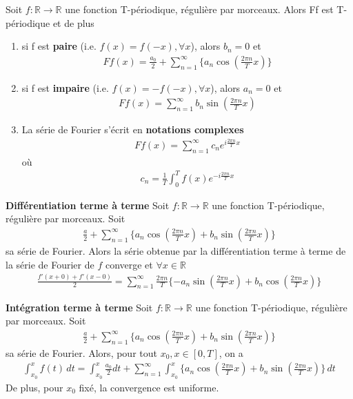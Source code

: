 Soit $f:\mathbb{R}\rightarrow\mathbb{R}$ une fonction T-périodique, régulière par morceaux. Alors Ff est T-périodique et de plus
\begin{enumerate}
	\item si f est \textbf{paire} (i.e. $f(x)=f(-x),\forall x$), alors $b_n=0$ et
	\begin{eqnarray}
		Ff(x)=\frac{a_0}{2}+\sum_{n=1}^{\infty}\{a_n\cos(\frac{2\pi n}{T}x)\}
	\end{eqnarray}
	
	\item si f est \textbf{impaire} (i.e. $f(x)=-f(-x),\forall x$), alors $a_n=0$ et
	\begin{eqnarray}
		Ff(x)=\sum_{n=1}^{\infty}b_n\sin(\frac{2\pi n}{T}x)
	\end{eqnarray}
	
	\item La série de Fourier s'écrit en \textbf{notations complexes}
	\begin{eqnarray}
		Ff(x)=\sum_{n=1}^{\infty}c_ne^{i\frac{2\pi n}{T}x}
	\end{eqnarray}
	où
	\begin{eqnarray}
		c_n=\frac{1}{T}\int_0^Tf(x)e^{-i\frac{2\pi n}{T}x}
	\end{eqnarray}
\end{enumerate}


\begin{myTheorem}
	\textbf{Différentiation terme à terme} Soit $f: \mathbb{R}\rightarrow\mathbb{R}$ une fonction T-périodique, régulière par morceaux. Soit
	\begin{eqnarray*}
		\frac{a}{2}+\sum_{n=1}^{\infty}\{a_n\cos(\frac{2\pi n}{T}x)+b_n\sin(\frac{2\pi n}{T}x)\}
	\end{eqnarray*}
	sa série de Fourier. Alors la série obtenue par la différentiation terme à terme de la série de Fourier de $f$ converge et $\forall x\in\mathbb{R}$
	\begin{eqnarray}
		\frac{f'(x+0)+f'(x-0)}{2}=\sum_{n=1}^{\infty}\frac{2\pi n}{T}\{-a_n\sin(\frac{2\pi n}{T}x)+b_n\cos(\frac{2\pi n}{T}x)\}
	\end{eqnarray}
\end{myTheorem}

\begin{myTheorem}
	\textbf{Intégration terme à terme} Soit $f: \mathbb{R}\rightarrow\mathbb{R}$ une fonction T-périodique, régulière par morceaux. Soit
	\begin{eqnarray*}
		\frac{a}{2}+\sum_{n=1}^{\infty}\{a_n\cos(\frac{2\pi n}{T}x)+b_n\sin(\frac{2\pi n}{T}x)\}
	\end{eqnarray*}
	sa série de Fourier. Alors, pour tout $x_0, x\in[0,T]$, on a
	\begin{eqnarray}
		\int_{x_0}^xf(t)\,dt=\int_{x_0}^x\frac{a_0}{2}dt+\sum_{n=1}^{\infty}\int_{x_0}^x\{a_n\cos(\frac{2\pi n}{T}x)+b_n\sin(\frac{2\pi n}{T}x)\}\,dt
	\end{eqnarray}
	De plus, pour $x_0$ fixé, la convergence est uniforme.
\end{myTheorem}


